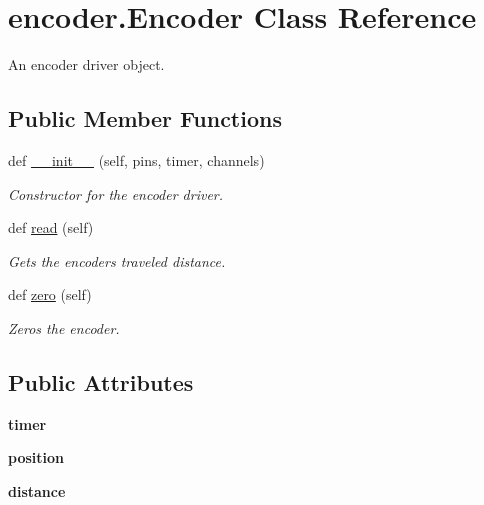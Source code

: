 \hypertarget{classencoder_1_1_encoder}{}\section{encoder.\+Encoder Class Reference}
\label{classencoder_1_1_encoder}


An encoder driver object.  


\subsection*{Public Member Functions}
\begin{DoxyCompactItemize}
\item 
def \mbox{\hyperlink{classencoder_1_1_encoder_a34939827412badc93f8744540676e833}{\+\_\+\+\_\+init\+\_\+\+\_\+}} (self, pins, timer, channels)
\begin{DoxyCompactList}\small\item\em Constructor for the encoder driver. \end{DoxyCompactList}\item 
def \mbox{\hyperlink{classencoder_1_1_encoder_aa1c1535160682500f5214f45d8197027}{read}} (self)
\begin{DoxyCompactList}\small\item\em Gets the encoder\textquotesingle{}s traveled distance. \end{DoxyCompactList}\item 
def \mbox{\hyperlink{classencoder_1_1_encoder_ae238ecdbcbce8a193c2e0ffbb4d1dd29}{zero}} (self)
\begin{DoxyCompactList}\small\item\em Zeros the encoder. \end{DoxyCompactList}\end{DoxyCompactItemize}
\subsection*{Public Attributes}
\begin{DoxyCompactItemize}
\item 
\mbox{\label{classencoder_1_1_encoder_a8e9c3e1317abc4f6fbe95468c69223d1}} 
{\bfseries timer}
\item 
\mbox{\label{classencoder_1_1_encoder_a9c15eb087b5869c188cf94e53ea3b4f5}} 
{\bfseries position}
\item 
\mbox{\label{classencoder_1_1_encoder_ac16be7b70ef28d19b75108d422f82e28}} 
{\bfseries distance}
\end{DoxyCompactItemize}


